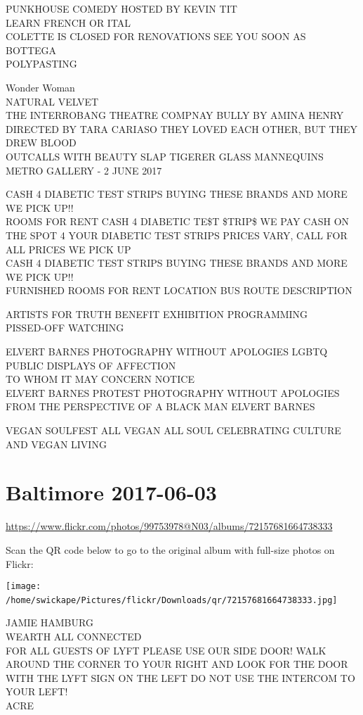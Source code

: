 \documentclass[10pt,letterpaper]{article}
\begin{document}
PUNKHOUSE COMEDY HOSTED BY KEVIN TIT\\
LEARN FRENCH OR ITAL\\
COLETTE IS CLOSED FOR RENOVATIONS SEE YOU SOON AS BOTTEGA\\
POLYPASTING

Wonder Woman\\
NATURAL VELVET\\
THE INTERROBANG THEATRE COMPNAY BULLY BY AMINA HENRY DIRECTED BY TARA CARIASO THEY LOVED EACH OTHER, BUT THEY DREW BLOOD\\
OUTCALLS WITH BEAUTY SLAP TIGERER GLASS MANNEQUINS METRO GALLERY {-} 2 JUNE 2017

CASH 4 DIABETIC TEST STRIPS BUYING THESE BRANDS AND MORE WE PICK UP!!\\
ROOMS FOR RENT CASH 4 DIABETIC TE\$T \$TRIP\$ WE PAY CASH ON THE SPOT 4 YOUR DIABETIC TEST STRIPS PRICES VARY, CALL FOR ALL PRICES WE PICK UP\\
CASH 4 DIABETIC TEST STRIPS BUYING THESE BRANDS AND MORE WE PICK UP!!\\
FURNISHED ROOMS FOR RENT LOCATION BUS ROUTE DESCRIPTION

ARTISTS FOR TRUTH BENEFIT EXHIBITION PROGRAMMING\\
PISSED{-}OFF WATCHING

ELVERT BARNES PHOTOGRAPHY WITHOUT APOLOGIES LGBTQ PUBLIC DISPLAYS OF AFFECTION\\
TO WHOM IT MAY CONCERN NOTICE\\
ELVERT BARNES PROTEST PHOTOGRAPHY WITHOUT APOLOGIES FROM THE PERSPECTIVE OF A BLACK MAN ELVERT BARNES

VEGAN SOULFEST ALL VEGAN ALL SOUL CELEBRATING CULTURE AND VEGAN LIVING
\

\section*{Baltimore 2017-06-03}

\url{https://www.flickr.com/photos/99753978@N03/albums/72157681664738333}

Scan the QR code below to go to the original album with full-size photos on Flickr:

\texttt{[image: /home/swickape/Pictures/flickr/Downloads/qr/72157681664738333.jpg]}
\

JAMIE HAMBURG\\
WEARTH ALL CONNECTED\\
FOR ALL GUESTS OF LYFT PLEASE USE OUR SIDE DOOR!  WALK AROUND THE CORNER TO YOUR RIGHT AND LOOK FOR THE DOOR WITH THE LYFT SIGN ON THE LEFT DO NOT USE THE INTERCOM TO YOUR LEFT!\\
ACRE
\end{document}
